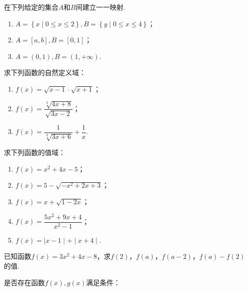 \documentclass[lang=cn,math=cm,chinesefont=nofont,11pt,scheme=chinese,twocol]{elegantbook}
\begin{document}
\begin{exercise}
  在下列给定的集合$A$和$B$间建立一一映射.
\end{exercise}

\begin{enumerate}
  \item $A=\left\{x\mid 0\leqslant x\leqslant 2\right\},B=\left\{y\mid 0\leqslant x\leqslant 4\right\}$；
  \item $A=[a,b],B=[0,1]$；
  \item $A=(0,1),B=(1,+\infty)$.
\end{enumerate}

\begin{exercise}
  求下列函数的自然定义域：
\end{exercise}

\begin{spacing}{1.8}
  \begin{enumerate}
  \item $f(x)=\sqrt{x-1}\cdot\sqrt{x+1}$；
  \item $f(x)=\dfrac{\sqrt[3]{4x+8}}{\sqrt{3x-2}}$；
  \item $f(x)=\dfrac1{\sqrt[3]{3x+6}}+\dfrac1x$.
  \end{enumerate}
\end{spacing}

\begin{exercise}
  求下列函数的值域：
\end{exercise}

\begin{enumerate}
  \item $f(x)=x^2+4x-5$；
  \item $f(x)=5-\sqrt{-x^{2}+2x+3}$；
  \item $f(x)=x+\sqrt{1-2x}$；
  \item \begin{spacing}{1.8}$f(x)=\dfrac{5x^{2}+9x+4}{x^{2}-1}$；\end{spacing}
  \item $f(x)=\mid x-1\mid+\mid x+4\mid $.
\end{enumerate}

\begin{exercise}
  已知函数$f(x)=3x^2+4x-8$，求$f(2)$，$f(a)$，$f(a-2)$，$f(a)-f(2)$的值.
\end{exercise}

\begin{exercise}\label{2017RJA.P74.17}
  是否存在函数$f(x),g(x)$满足条件：
\end{exercise}
\end{document}
